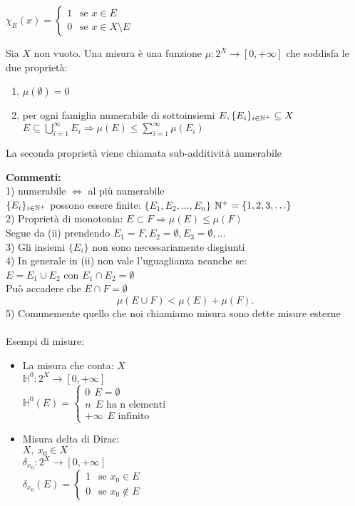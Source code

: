 \documentclass{article}
\begin{document}
	 $\chi_E(x) = \begin{cases}
		 1 \ \ \text { se } x\in E\\
		 0 \ \ \text { se } x\in X\setminus E
	 \end{cases}$
	 \begin{defi}
		 Sia $X$ non vuoto. Una misura è una funzione $\mu : 2^X \rightarrow [0,+\infty]$ che soddisfa le due proprietà:
		 \begin{enumerate}
			 \item $\mu(\emptyset) = 0$
			 \item  per ogni famiglia numerabile di sottoinsiemi $E,\{E_i\}_{i\in\mathbb{N}^+} \subseteq X$\\
				 $\displaystyle E\subseteq\bigcup_{i=1}^\infty E_i \Rightarrow \mu(E)\leq \sum^\infty_{i=1}\mu(E_i)$
		 \end{enumerate}
		 La seconda proprietà viene chiamata sub-additività numerabile
	 \end{defi}
\textbf{Commenti:}\\
1) numerabile $ \Leftrightarrow $ al più numerabile\\
$\{E_i\}_{i\in\mathbb{N}^+}$ possono essere finite: $\{E_1,E_2,\ldots,E_n\}$ 
$\mathbb{N}^+ = \{1,2,3,\ldots\}$\\
2) Proprietà di monotonia: $E\subset F \Rightarrow \mu(E)\leq \mu (F)$\\
Segue da (ii) prendendo $E_1 = F, E_2 = \emptyset, E_3=\emptyset, \ldots$\\
3) Gli insiemi $\{E_i\}$ non sono necessariamente disgiunti\\
4) In generale in (ii) non vale l'uguaglianza neanche se:\\ $E = E_1\cup E_2 $ con $E_1\cap E_2= \emptyset$\\
Può accadere che $E\cap F = \emptyset$\\
 \[
\mu(E\cup F) < \mu(E) + \mu (F)
.\] 
5) Comunemente quello che noi chiamiamo misura sono dette misure esterne\\
\hline\ \\
Esempi di misure:
\begin{itemize}
	\item La misura che conta: $X$\\
		$\mathbb H^0: 2^X \rightarrow [0,+\infty]$\\
		$\mathbb H^0(E) = \begin{cases}
			0 \ \ E =\emptyset\\
			n \ \ E \text{ ha n elementi}\\
			+\infty \ \ E \text { infinito}
		\end{cases}$
	\item Misura delta di Dirac:\\
		$X, \ x_0\in X$\\
		$\delta_{x_0}: 2^X \rightarrow[0,+\infty]$\\
		$\delta_{x_0}(E) = \begin{cases}
			1 \ \ \text{ se } x_0\in E\\
			0 \ \ \text { se } x_0 \not\in E
		\end{cases}$
\end{itemize}
\end{document}
